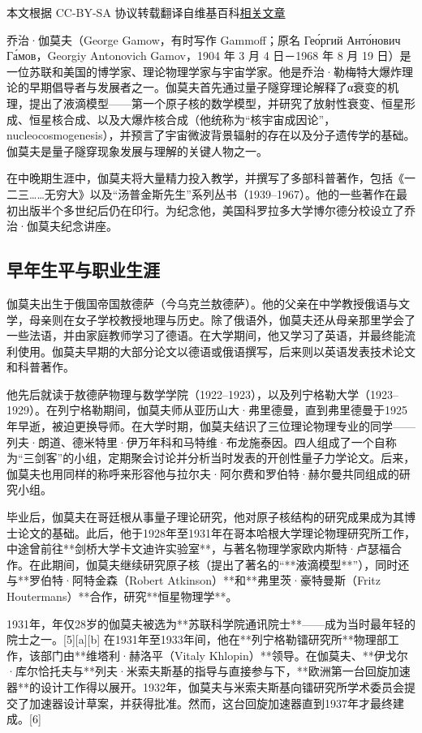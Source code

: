 
本文根据 CC-BY-SA 协议转载翻译自维基百科\href{https://en.wikipedia.org/wiki/George_Gamow}{相关文章}

乔治·伽莫夫（George Gamow，有时写作 Gammoff；原名 Гео́ргий Анто́нович Га́мов，Georgiy Antonovich Gamov，1904 年 3 月 4 日－1968 年 8 月 19 日）是一位苏联和美国的博学家、理论物理学家与宇宙学家。他是乔治·勒梅特大爆炸理论的早期倡导者与发展者之一。伽莫夫首先通过量子隧穿理论解释了α衰变的机理，提出了液滴模型——第一个原子核的数学模型，并研究了放射性衰变、恒星形成、恒星核合成、以及大爆炸核合成（他统称为“核宇宙成因论”，nucleocosmogenesis），并预言了宇宙微波背景辐射的存在以及分子遗传学的基础。伽莫夫是量子隧穿现象发展与理解的关键人物之一。

在中晚期生涯中，伽莫夫将大量精力投入教学，并撰写了多部科普著作，包括《一二三……无穷大》以及“汤普金斯先生”系列丛书（1939–1967）。他的一些著作在最初出版半个多世纪后仍在印行。为纪念他，美国科罗拉多大学博尔德分校设立了乔治·伽莫夫纪念讲座。
\subsection{早年生平与职业生涯}
伽莫夫出生于俄国帝国敖德萨（今乌克兰敖德萨）。他的父亲在中学教授俄语与文学，母亲则在女子学校教授地理与历史。除了俄语外，伽莫夫还从母亲那里学会了一些法语，并由家庭教师学习了德语。在大学期间，他又学习了英语，并最终能流利使用。伽莫夫早期的大部分论文以德语或俄语撰写，后来则以英语发表技术论文和科普著作。

他先后就读于敖德萨物理与数学学院（1922–1923），以及列宁格勒大学（1923–1929）。在列宁格勒期间，伽莫夫师从亚历山大·弗里德曼，直到弗里德曼于1925年早逝，被迫更换导师。在大学时期，伽莫夫结识了三位理论物理专业的同学——列夫·朗道、德米特里·伊万年科和马特维·布龙施泰因。四人组成了一个自称为“三剑客”的小组，定期聚会讨论并分析当时发表的开创性量子力学论文。后来，伽莫夫也用同样的称呼来形容他与拉尔夫·阿尔费和罗伯特·赫尔曼共同组成的研究小组。

毕业后，伽莫夫在哥廷根从事量子理论研究，他对原子核结构的研究成果成为其博士论文的基础。此后，他于1928年至1931年在哥本哈根大学理论物理研究所工作，中途曾前往**剑桥大学卡文迪许实验室**，与著名物理学家欧内斯特·卢瑟福合作。在此期间，伽莫夫继续研究原子核（提出了著名的“**液滴模型**”），同时还与**罗伯特·阿特金森（Robert Atkinson）**和**弗里茨·豪特曼斯（Fritz Houtermans）**合作，研究**恒星物理学**。

1931年，年仅28岁的伽莫夫被选为**苏联科学院通讯院士**——成为当时最年轻的院士之一。[5][a][b] 在1931年至1933年间，他在**列宁格勒镭研究所**物理部工作，该部门由**维塔利·赫洛平（Vitaly Khlopin）**领导。在伽莫夫、**伊戈尔·库尔恰托夫与**列夫·米索夫斯基的指导与直接参与下，**欧洲第一台回旋加速器**的设计工作得以展开。1932年，伽莫夫与米索夫斯基向镭研究所学术委员会提交了加速器设计草案，并获得批准。然而，这台回旋加速器直到1937年才最终建成。[6]
